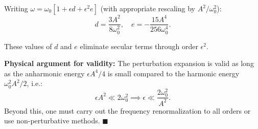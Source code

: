 \documentclass[12pt]{article}
\begin{document}
Writing $\omega = \omega_0[1+\epsilon d + \epsilon^2 e]$ (with appropriate rescaling by $A^2/\omega_0^2$):
\[
d = \frac{3A^2}{8\omega_0^2}, \quad e = -\frac{15A^4}{256\omega_0^4}.
\]

These values of $d$ and $e$ eliminate secular terms through order $\epsilon^2$.

\textbf{Physical argument for validity:} The perturbation expansion is valid as long as the anharmonic energy $\epsilon A^4/4$ is small compared to the harmonic energy $\omega_0^2 A^2/2$, i.e.:
\[
\epsilon A^2 \ll 2\omega_0^2 \implies \epsilon \ll \frac{2\omega_0^2}{A^2}.
\]
Beyond this, one must carry out the frequency renormalization to all orders or use non-perturbative methods. $\blacksquare$
\end{document}
